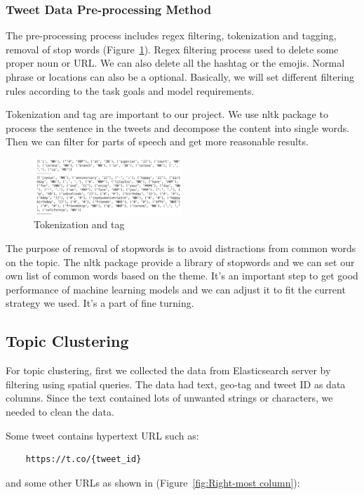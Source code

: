 \subsubsection{Tweet Data Pre-processing Method}
The pre-processing process includes regex filtering, tokenization and tagging,
removal of stop words (Figure~\ref{fig:Tokenization and tag}). Regex
filtering process used to delete some proper noun or URL. We can also delete
all the hashtag or the emojis. Normal phrase or locations can also be a
optional. Basically, we will set different filtering rules according to the
task goals and model requirements. 

Tokenization and tag are important to our project. We use nltk package to
process the sentence in the tweets and decompose the content into single
words. Then we can filter for parts of speech and get more reasonable
results. 
\begin{figure}[h]
\centering
\includegraphics[width=0.5\textwidth]{imgs/tokenization.png}
\caption{Tokenization and tag}
\label{fig:Tokenization and tag}
\end{figure}
The purpose of removal of stopwords is to avoid distractions from common words
on the topic. The nltk package provide a library of stopwords and we can set
our own list of common words based on the theme. It's an important step to
get good performance of machine learning models and we can adjust it to fit
the current strategy we used. It's a part of fine turning. 

\subsection{Topic Clustering}
For topic clustering, first we collected the data from Elasticsearch server by
filtering using spatial queries. The data had text, geo-tag and tweet ID as
data columns. Since the text contained lots of unwanted strings or
characters, we needed to clean the data. 

Some tweet contains hypertext URL such as: 
\begin{verbatim}
    https://t.co/{tweet_id}
\end{verbatim} and some other URLs as shown in (Figure~\ref{fig:Right-most column}):
    
